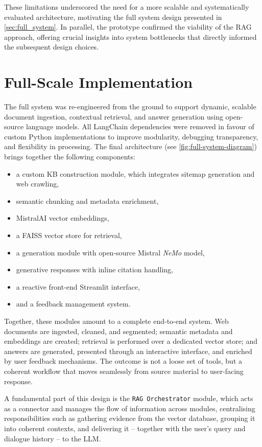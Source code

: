 \begin{spacing}{1.5}
These limitations underscored the need for a more scalable and systematically evaluated architecture, motivating the full system design presented in \autoref{sec:full_system}. In parallel, the prototype confirmed the viability of the RAG approach, offering crucial insights into system bottlenecks that directly informed the subsequent design choices.


\section{Full-Scale Implementation}\label{sec:full_system}
The full system was re-engineered from the ground to support dynamic, scalable document ingestion, contextual retrieval, and answer generation using open-source language models. All LangChain dependencies were removed in favour of custom Python implementations to improve modularity, debugging transparency, and flexibility in processing. The final architecture (see \autoref{fig:full-system-diagram}) brings together the following components:
\begin{itemize}
      \item a custom KB construction module, which integrates sitemap generation and web crawling,
      \item semantic chunking and metadata enrichment,
      \item MistralAI vector embeddings,
      \item a FAISS vector store for retrieval,
      \item a generation module with open-source Mistral \textit{NeMo} model,
      \item generative responses with inline citation handling,
      \item a reactive front-end Streamlit interface,
      \item and a feedback management system.
\end{itemize}

Together, these modules amount to a complete end-to-end system. Web documents are ingested, cleaned, and segmented; semantic metadata and embeddings are created; retrieval is performed over a dedicated vector store; and answers are generated, presented through an interactive interface, and enriched by user feedback mechanisms. The outcome is not a loose set of tools, but a coherent workflow that moves seamlessly from source material to user-facing response.

A fundamental part of this design is the \texttt{RAG Orchestrator} module, which acts as a connector and manages the flow of information across modules, centralising responsibilities such as gathering evidence from the vector database, grouping it into coherent contexts, and delivering it -- together with the user’s query and dialogue history -- to the LLM.




\end{spacing}
